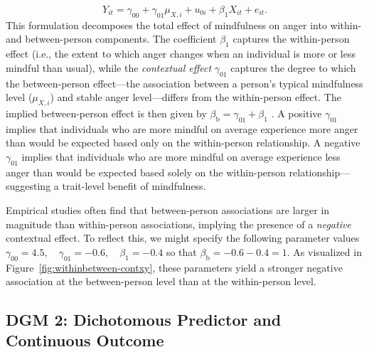 \documentclass[stu]{apa7}
\begin{document}
\begin{equation}
    Y_{it} = \gamma_{00} + \gamma_{01} \mu_{X,i} + u_{0i} + \beta_1 X_{it} + e_{it}.
\end{equation}
This formulation decomposes the total effect of mindfulness on anger into within- and between-person components. The coefficient \( \beta_1 \) captures the within-person effect (i.e., the extent to which anger changes when an individual is more or less mindful than usual), while the \textit{contextual effect} \( \gamma_{01} \) captures the degree to which the between-person effect---the association between a person's typical mindfulness level (\( \mu_{X,i} \)) and stable anger level---differs from the within-person effect. The implied between-person effect is then given by $\beta_\text{b} = \gamma_{01} + \beta_1$ \parencite{mundlak_pooling_1978}. A positive \( \gamma_{01} \) implies that individuals who are more mindful on average experience more anger than would be expected based only on the within-person relationship. A negative \( \gamma_{01} \) implies that individuals who are more mindful on average experience less anger than would be expected based solely on the within-person relationship—suggesting a trait-level benefit of mindfulness. 

Empirical studies often find that between-person associations are larger in magnitude than within-person associations, implying the presence of a \textit{negative} contextual effect. To reflect this, we might specify the following parameter values $
\gamma_{00} = 4.5,\quad \gamma_{01} = -0.6,\quad \beta_1 = -0.4$ so that $\beta_\text{b} = -0.6 - 0.4 = 1$. As visualized in Figure~\ref{fig:withinbetween-contxy}, these parameters yield a stronger negative association at the between-person level than at the within-person level.



\subsection{DGM 2: Dichotomous Predictor and Continuous Outcome}
\end{document}

